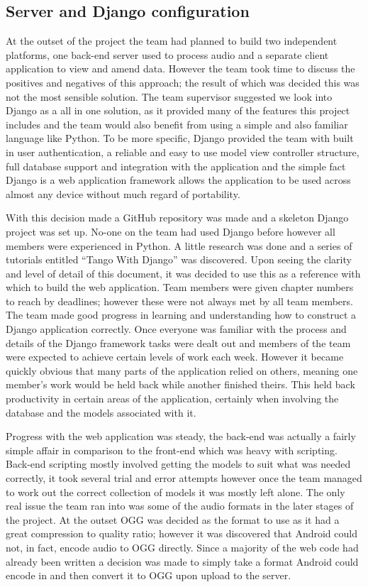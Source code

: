 \documentclass{l3proj}
\begin{document}
\subsection{Server and Django configuration}

At the outset of the project the team had planned to build two independent platforms, one back-end server used to process audio and a separate client application to view and amend data. However the team took time to discuss the positives and negatives of this approach; the result of which was decided this was not the most sensible solution.
The team supervisor suggested we look into Django as a all in one solution, as it provided many of the features this project includes and the team would also benefit from using a simple and also familiar language like Python.
To be more specific, Django provided the team with built in user authentication, a reliable and easy to use model view controller structure, full database support and integration with the application and the simple fact Django is a web application framework allows the application to be used across almost any device without much regard of portability.

With this decision made a GitHub repository was made and a skeleton Django project was set up. No-one on the team had used Django before however all members were experienced in Python. A little research was done and a series of tutorials entitled “Tango With Django” was discovered.
Upon seeing the clarity and level of detail of this document, it was decided to use this as a reference with which to build the web application.
Team members were given chapter numbers to reach by deadlines; however these were not always met by all team members. The team made good progress in learning and understanding how to construct a Django application correctly.
Once everyone was familiar with the process and details of the Django framework tasks were dealt out and members of the team were expected to achieve certain levels of work each week. However it became quickly obvious that many parts of the application relied on others, meaning one member’s work would be held back while another finished theirs. This held back productivity in certain areas of the application, certainly when involving the database and the models associated with it.

Progress with the web application was steady, the back-end was actually a fairly simple affair in comparison to the front-end which was heavy with scripting.
Back-end scripting mostly involved getting the models to suit what was needed correctly, it took several trial and error attempts however once the team managed to work out the correct collection of models it was mostly left alone. The only real issue the team ran into was some of the audio formats in the later stages of the project. At the outset OGG was decided as the format to use as it had a great compression to quality ratio; however it was discovered that Android could not, in fact, encode audio to OGG directly. Since a majority of the web code had already been written a decision was made to simply take a format Android could encode in and then convert it to OGG upon upload to the server.
\end{document}
